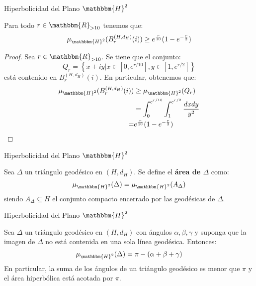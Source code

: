 \documentclass[xcolor=dvipsnames]{beamer}
\theoremstyle{largebreak}
\newcommand{\bbm}[1]{\ensuremath{\mathbbm{#1}}}
\begin{document}
\begin{frame}{Hiperbolicidad del Plano $\bbm{H}^2$}
    \begin{propo}
        Para todo $r\in\bbm{R}_{>10}$ tenemos que:
        \begin{equation*}
            \mu_{\bbm{H}^2}(B_r^{(H,d_H)}(i))\geq e^{\frac{r}{10}}(1-e^{-\frac{r}{2}})
        \end{equation*}
    \end{propo}
    \begin{proof}
        Sea $r\in\bbm{R}_{>10}$. Se tiene que el conjunto:
        \begin{equation*}
            Q_r=\left\{x+iy\Big|x\in[0,e^{ r/10}],y\in[1,e^{r/2}] \right\}
        \end{equation*}
        está contenido en $B_r^{(H,d_H)}(i)$. En particular, obtenemos que:
        \begin{equation*}
            \begin{split}
                \mu_{\bbm{H}^2}(B_r^{(H,d_H)}(i))&\geq\mu_{\bbm{H}^2}(Q_r)\\
                &=\int_{0}^{e^{r/10}}\int_{1}^{e^{r/2}}\frac{dxdy}{y^2}\\
                =&e^{\frac{r}{10}}(1-e^{-\frac{r}{2}})\\
            \end{split}
        \end{equation*}
    \end{proof}
\end{frame}

\begin{frame}{Hiperbolicidad del Plano $\bbm{H}^2$}
    \begin{mydef}
        Sea $\Delta$ un triángulo geodésico en $(H,d_H)$. Se define el \textbf{área de $\Delta$} como:
        \begin{equation*}
            \mu_{\bbm{H}^2}(\Delta)=\mu_{\bbm{H}^2}(A_\Delta)
        \end{equation*}
        siendo $A_\Delta\subseteq H$ el conjunto compacto encerrado por las geodésicas de $\Delta$.
    \end{mydef}
\end{frame}

\begin{frame}{Hiperbolicidad del Plano $\bbm{H}^2$}
    \begin{theor}
        Sea $\Delta$ un triángulo geodésico en $(H,d_H)$ con ángulos $\alpha,\beta,\gamma$ y suponga que la imagen de $\Delta$ no está contenida en una sola línea geodésica. Entonces:
        \begin{equation*}
            \mu_{\bbm{H}^2}(\Delta)=\pi-(\alpha+\beta+\gamma)
        \end{equation*}
        En particular, la suma de los ángulos de un triángulo geodésico es menor que $\pi$ y el área hiperbólica está acotada por $\pi$.
    \end{theor}
\end{frame}
\end{document}
